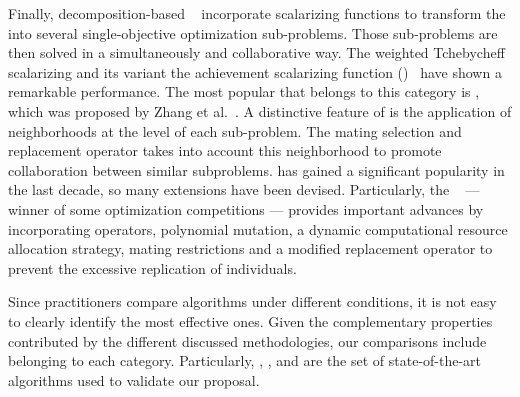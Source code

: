 Finally, decomposition-based \MOEAS{}~\cite{ishibuchi1998multi} incorporate scalarizing functions to transform the \MOP{} 
into several single-objective optimization sub-problems.
%
Those sub-problems are then solved in a simultaneously and collaborative way.
%
The weighted Tchebycheff scalarizing and its variant the achievement scalarizing function (\ASF{})~\cite{hernandez2015improved,Pescador:17}
have shown a remarkable performance.
%
The most popular \MOEA{} that belongs to this category is \MOEAD{}, which was proposed by Zhang et al.~\cite{zhang2007moea}.
%
A distinctive feature of \MOEAD{} is the application of neighborhoods at the level of each sub-problem.
%
The mating selection and replacement operator takes into account this neighborhood to promote collaboration
between similar subproblems.
%
\MOEAD{} has gained a significant popularity in the last decade, so many extensions have been devised.
%
Particularly, the \MOEADDE{}~\cite{li2009multiobjective} --- winner of some optimization competitions --- provides
important advances by incorporating \DE{} operators, polynomial mutation, a dynamic computational resource allocation strategy, 
mating restrictions and a modified replacement operator to prevent the excessive replication of individuals. 

Since practitioners compare algorithms under different conditions, it is not easy to clearly identify the most effective ones.
%
Given the complementary properties contributed by the different discussed methodologies, our comparisons include \MOEAS{} belonging
to each category. Particularly, \NSGAII{}, \NSGAIII{}, \RMOEA{} and \MOEADDE{} are the set of state-of-the-art algorithms used
to validate our proposal.
